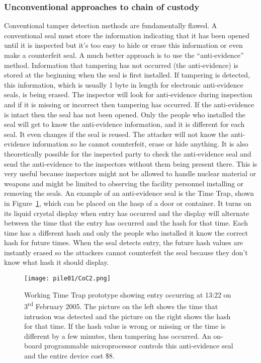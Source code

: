 \documentclass[twoside,titlepage,11pt,twocolumn,a4paper]{article}
\begin{document}
\subsubsection{Unconventional approaches to chain of custody}

Conventional tamper detection methods are fundamentally flawed. A
conventional seal must store the information indicating that it has
been opened until it is inspected but it’s too easy to hide or erase
this information or even make a counterfeit seal. A much better
approach is to use the ``anti-evidence'' method. Information that
tampering has not occurred (the anti-evidence) is stored at the
beginning when the seal is first
installed. \citep{nuclearSafeguardsAndSec2005} If tampering is
detected, this information, which is usually 1 byte in length for
electronic anti-evidence seals, is being erased.
\citep{unconventionalCoC2010} The inspector will look for
anti-evidence during inspection and if it is missing or incorrect then
tampering has occurred. If the anti-evidence is intact then the seal
has not been opened. Only the people who installed the seal will get
to know the anti-evidence information, and it is different for each
seal. It even changes if the seal is reused. The attacker will not
know the anti-evidence information so he cannot counterfeit, erase or
hide anything. \citep{nuclearSafeguardsAndSec2005} It is also
theoretically possible for the inspected party to check the
anti-evidence seal and send the anti-evidence to the inspectors
without them being present there. \citep{unconventionalCoC2010} This
is very useful because inspectors might not be allowed to handle
nuclear material or weapons and might be limited to observing the
facility personnel installing or removing the seals. An example of an
anti-evidence seal is the Time Trap, shown in Figure~\ref{fig:CoC2},
which can be placed on the hasp of a door or container. It turns on
its liquid crystal display when entry has occurred and the display
will alternate between the time that the entry has occurred and the
hash for that time. Each time has a different hash and only the people
who installed it know the correct hash for future times. When the seal
detects entry, the future hash values are instantly erased so the
attackers cannot counterfeit the seal because they don't know what
hash it should display. \citep{nuclearSafeguardsAndSec2005}

\begin{figure}
  \texttt{[image: pile01/CoC2.png]}
  \caption{Working Time Trap prototype showing entry occurring at
    13:22 on 3\textsuperscript{rd} February 2005. The picture on the
    left shows the time that intrusion was detected and the picture on
    the right shows the hash for that time. If the hash value is wrong
    or missing or the time is different by a few minutes, then
    tampering has occurred. An on-board programmable microprocessor
    controls this anti-evidence seal and the entire device cost
    \$8. \citep{nuclearSafeguardsAndSec2005}}
  \label{fig:CoC2}
\end{figure}
\end{document}
